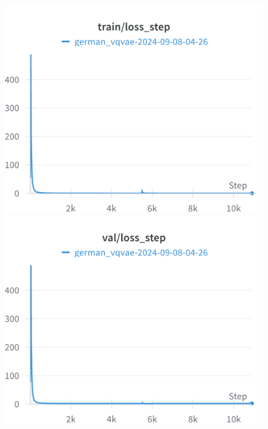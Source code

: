 \begin{figure}[H]
\includegraphics[width=\linewidth]{detailed_engineering/German VQVAE/charts/train_loss_step.png}
\caption{}
\endminipage\hfill
{}
\includegraphics[width=\linewidth]{detailed_engineering/German VQVAE/charts/val_loss_step.png}
\caption{}
\endminipage
\end{figure}

